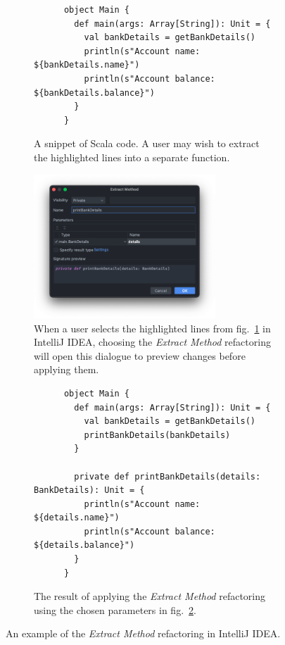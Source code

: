 \begin{figure}[htbp]
  \centering
  \begin{subfigure}{\textwidth}
    \centering
    \begin{verbatim}
      object Main {
        def main(args: Array[String]): Unit = {
          val bankDetails = getBankDetails()
          println(s"Account name: ${bankDetails.name}")
          println(s"Account balance: ${bankDetails.balance}")
        }
      }
    \end{verbatim}
    \caption{A snippet of Scala code. A user may wish to extract the highlighted lines into a separate function.}
    \label{fig:extract-function-intellij-before}
  \end{subfigure}
  \begin{subfigure}{\textwidth}
    \centering
    \includegraphics[width=0.75\textwidth]{background/extract-function-intellij.png}
    \caption{When a user selects the highlighted lines from fig.~\ref{fig:extract-function-intellij-before} in IntelliJ IDEA, choosing the \textit{Extract Method} refactoring will open this dialogue to preview changes before applying them.}
    \label{fig:extract-function-intellij-dialogue}
  \end{subfigure}
  \begin{subfigure}{\textwidth}
    \vspace{3ex} %
    \centering
    \begin{verbatim}
      object Main {
        def main(args: Array[String]): Unit = {
          val bankDetails = getBankDetails()
          printBankDetails(bankDetails)
        }

        private def printBankDetails(details: BankDetails): Unit = {
          println(s"Account name: ${details.name}")
          println(s"Account balance: ${details.balance}")
        }
      }
    \end{verbatim}
    \caption{The result of applying the \textit{Extract Method} refactoring using the chosen parameters in fig.~\ref{fig:extract-function-intellij-dialogue}.}
  \end{subfigure}
  \caption{An example of the \textit{Extract Method} refactoring in IntelliJ IDEA.}
  \label{fig:extract-function-intellij}
\end{figure}

